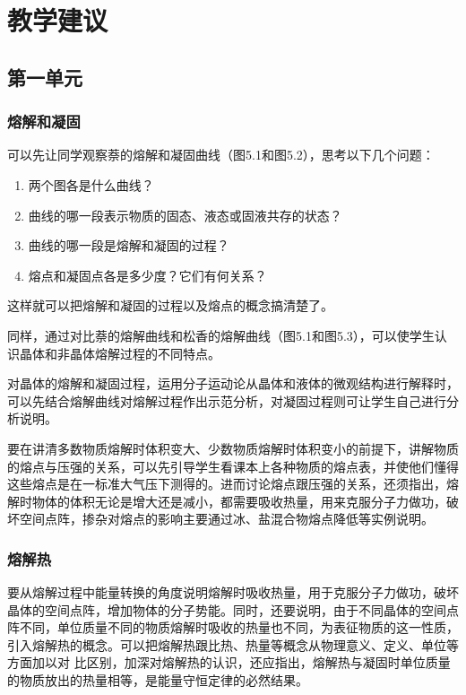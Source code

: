 \section{教学建议}
\subsection{第一单元}
\subsubsection{熔解和凝固} 

可以先让同学观察萘的熔解和凝固曲线（图5.1和图5.2），思考以下几个问题：
\begin{enumerate}
\item 两个图各是什么曲线？    \item 曲线的哪一段表示物质的固态、液态或固液共存的状态？    \item 曲线的哪一段是熔解和凝固的过程？    \item 熔点和凝固点各是多少度？它们有何关系？
\end{enumerate}
这样就可以把熔解和凝固的过程以及熔点的概念搞清楚了。
\begin{figure}[htp]
    \centering
    \caption{}
\end{figure}

同样，通过对比萘的熔解曲线和松香的熔解曲线（图5.1和图5.3），可以使学生认识晶体和非晶体熔解过程的不同特点。

对晶体的熔解和凝固过程，运用分子运动论从晶体和液体的微观结构进行解释时，可以先结合熔解曲线对熔解过程作出示范分析，对凝固过程则可让学生自己进行分析说明。

要在讲清多数物质熔解时体积变大、少数物质熔解时体积变小的前提下，讲解物质的熔点与压强的关系，可以先引导学生看课本上各种物质的熔点表，并使他们懂得这些熔点是在一标准大气压下测得的。进而讨论熔点跟压强的关系，还须指出，熔解时物体的体积无论是增大还是减小，都需要吸收热量，用来克服分子力做功，破坏空间点阵，掺杂对熔点的影响主要通过冰、盐混合物熔点降低等实例说明。

\subsubsection{熔解热}

要从熔解过程中能量转换的角度说明熔解时吸收热量，用于克服分子力做功，破坏晶体的空间点阵，增加物体的分子势能。同时，还要说明，由于不同晶体的空间点阵不同，单位质量不同的物质熔解时吸收的热量也不同，为表征物质的这一性质，引入熔解热的概念。可以把熔解热跟比热、热量等概念从物理意义、定义、单位等方面加以对
比区别，加深对熔解热的认识，还应指出，熔解热与凝固时单位质量的物质放出的热量相等，是能量守恒定律的必然结果。

